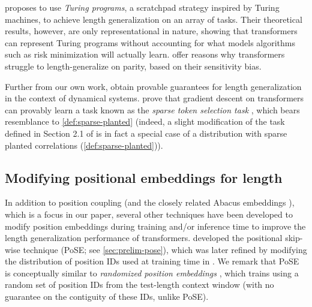 \documentclass{article}
\begin{document}
\citet{hou_universal_2024} proposes to use \emph{Turing programs}, a scratchpad strategy inspired by Turing machines, to achieve length generalization on an array of tasks. Their  theoretical results, however, are only representational in nature, showing that transformers can represent Turing programs without  accounting for what models algorithms such as risk minimization will actually learn. \citet{hahn_why_2024} offer reasons why transformers struggle to length-generalize on parity, based on their sensitivity bias. 

Further from our own work, \citet{marsden_provable_2024} obtain provable guarantees for length generalization in the context of dynamical systems. \citet{wang_transformers_2024} prove that gradient descent on transformers can provably learn a task known as the \emph{sparse token selection task} \cite{sanford_representational_2023}, which bears resemblance to \cref{def:sparse-planted} (indeed, a slight modification of the task defined in Section 2.1 of \citet{wang_transformers_2024} is in fact a special case of a distribution with sparse planted correlations (\cref{def:sparse-planted})). 




\subsection{Modifying positional embeddings for length \generalization}
\label{sec:related-posids}
In addition to position coupling \cite{cho_position_2024,cho_arithmetic_2024} (and the closely related Abacus embeddings  \cite{mcleish_transformers_2024}), which is a focus in our paper, several other techniques have been developed to modify position embeddings during training and/or inference time to improve the length generalization performance of transformers. \citet{zhu_pose_2024} developed the positional skip-wise technique (PoSE; see \cref{sec:prelim-pose}), which was later refined by modifying the distribution of position IDs used at training time in \citet{wu_never_2024}. We remark that PoSE is conceptually similar to \emph{randomized position embeddings} \cite{ruoss_randomized_2023}, which trains using a random set of position IDs from the test-length context window (with no guarantee on the contiguity of these IDs, unlike PoSE).
\end{document}
